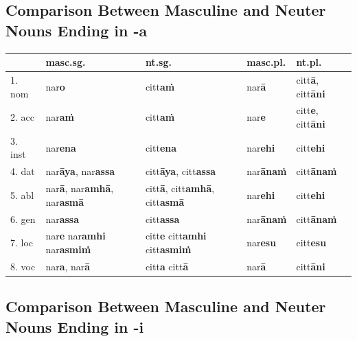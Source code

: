\documentclass[11pt,oneside]{memoir}
\begin{document}
\clearpage

\subsection{Comparison Between Masculine and Neuter Nouns Ending in -a}
\label{sec:orgb46bcce}

\begin{center}
\begin{tabular}{lllll}
 & \textbf{masc.sg.} & \textbf{nt.sg.} & \textbf{masc.pl.} & \textbf{nt.pl.}\\[0pt]
\hline
1. nom & nar\textbf{o} & citt\textbf{aṁ} & nar\textbf{ā} & citt\textbf{ā}, citt\textbf{āni}\\[0pt]
2. acc & nar\textbf{aṁ} & citt\textbf{aṁ} & nar\textbf{e} & citt\textbf{e}, citt\textbf{āni}\\[0pt]
3. inst & nar\textbf{ena} & citt\textbf{ena} & nar\textbf{ehi} & citt\textbf{ehi}\\[0pt]
4. dat & nar\textbf{āya}, nar\textbf{assa} & citt\textbf{āya}, citt\textbf{assa} & nar\textbf{ānaṁ} & citt\textbf{ānaṁ}\\[0pt]
5. abl & nar\textbf{ā}, nar\textbf{amhā}, nar\textbf{asmā} & citt\textbf{ā}, citt\textbf{amhā}, citt\textbf{asmā} & nar\textbf{ehi} & citt\textbf{ehi}\\[0pt]
6. gen & nar\textbf{assa} & citt\textbf{assa} & nar\textbf{ānaṁ} & citt\textbf{ānaṁ}\\[0pt]
7. loc & nar\textbf{e} nar\textbf{amhi} nar\textbf{asmiṁ} & citt\textbf{e} citt\textbf{amhi} citt\textbf{asmiṁ} & nar\textbf{esu} & citt\textbf{esu}\\[0pt]
8. voc & nar\textbf{a}, nar\textbf{ā} & citt\textbf{a} citt\textbf{ā} & nar\textbf{ā} & citt\textbf{āni}\\[0pt]
\end{tabular}
\end{center}

\subsection{Comparison Between Masculine and Neuter Nouns Ending in -i}
\label{sec:org217f34f}
\end{document}
